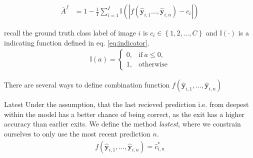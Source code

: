 \begin{enumdescript}
		\begin{align}
		\bar{A}^f &= 1 - \frac{1}{I} \sum_{i=1}^{I}\mathbb{I}\left(\left|f\left(\bm{\hat{y}}_{i,1} \dots, \bm{\hat{y}}_{i,n}\right)-c_i\right|\right)
		\end{align}
		
		recall the ground truth class label of image $ i $ is $ c_i \in \left\{1, 2, \dots, C \right\} $ and $ \mathbb{I(\cdot)}  $ is a indicating function defined in eq. \ref{eq:indicator}.
		\begin{align*}
		\mathbb{I}(a)= \begin{cases}
		0, & \mathrm{if\:} a \leq 0, \\
		1, & \mathrm{otherwise}
		\end{cases}
		\end{align*}
		
		There are several ways to define combination function $ f\left(\bm{\hat{y}}_{i,1}, \dots, \bm{\hat{y}}_{i,n}\right) $
		\begin{enumdescript}
			
			
			\item[Latest] Under the assumption, that the last recieved prediction i.e. from deepest within the model has a better chance of being correct, as the exit has a higher accuracy than earlier exits. We define the method \emph{lastest}, where we constrain ourselves to only use the most recent prediction $n$.
			\begin{align}
			f\left(\bm{\hat{y}}_{i,1}, \dots, \bm{\hat{y}}_{i,n} \right) = \hat{c}_{i,n}^{*}
			\end{align}
			

\end{enumdescript}
\end{enumdescript}

